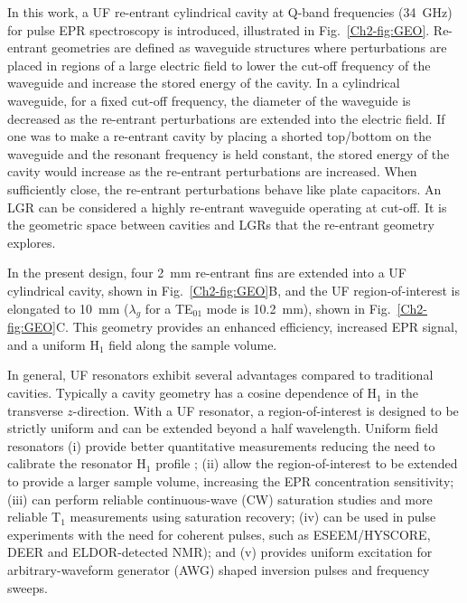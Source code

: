 In this work, a UF re-entrant cylindrical \cylTE{} cavity at Q-band frequencies (34~GHz) for pulse EPR spectroscopy is introduced, illustrated in Fig.~\ref{Ch2-fig:GEO}. Re-entrant geometries are defined as waveguide structures where perturbations are placed in regions of a large electric field to lower the cut-off frequency of the waveguide and increase the stored energy of the cavity. \cite{ramo1984fields, MITRadWaveguide} In a cylindrical waveguide, for a fixed cut-off frequency, the diameter of the waveguide is decreased as the re-entrant perturbations are extended into the electric field. If one was to make a re-entrant cavity by placing a shorted top/bottom on the waveguide and the resonant frequency is held constant, the stored energy of the cavity would increase as the re-entrant perturbations are increased. When sufficiently close, the re-entrant perturbations behave like plate capacitors. An LGR can be considered a highly re-entrant waveguide operating at cut-off. It is the geometric space between cavities and LGRs that the re-entrant geometry explores. 

In the present design, four 2~mm re-entrant fins are extended into a UF cylindrical \cylTE{} cavity, shown in Fig.~\ref{Ch2-fig:GEO}B, and the UF region-of-interest is elongated to 10~mm ($\lambda_g$ for a TE$_{01}$ mode is 10.2~mm), shown in Fig.~\ref{Ch2-fig:GEO}C. This geometry provides an enhanced efficiency, increased EPR signal, and a uniform H$_1$ field along the sample volume.

In general, UF resonators exhibit several advantages compared to traditional cavities. Typically a cavity geometry has a cosine dependence of H$_1$ in the transverse $z$-direction. With a UF resonator, a region-of-interest is designed to be strictly uniform and can be extended beyond a half wavelength. Uniform field resonators (i) provide better quantitative measurements reducing the need to calibrate the resonator H$_1$ profile \cite{eaton2010quantitative}; (ii) allow the region-of-interest to be extended to provide a larger sample volume, increasing the EPR concentration sensitivity; (iii) can perform reliable continuous-wave (CW) saturation studies \cite{klugsdsl} and more reliable T$_1$ measurements using saturation recovery;  (iv) can be used in pulse experiments with the need for coherent pulses, such as ESEEM/HYSCORE, DEER\cite{pulsejeschke} and ELDOR-detected NMR\cite{COX201763}); and (v) provides uniform excitation for arbitrary-waveform generator (AWG) shaped inversion pulses \cite{stollshaped, shapedpulse} and frequency sweeps. \cite{DOLL201746}

